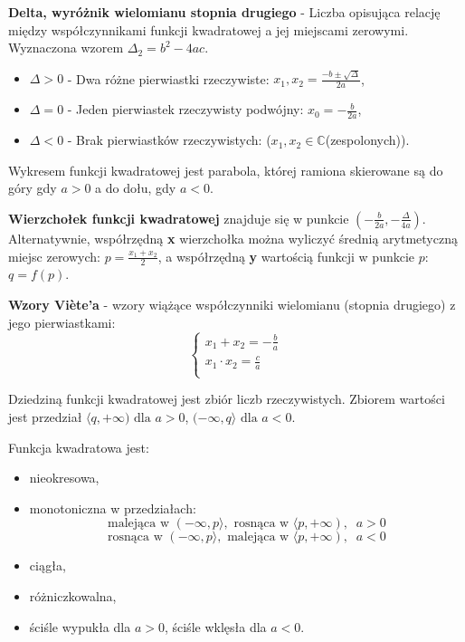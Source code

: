 \documentclass[14pt,a4paper]{extarticle}
\begin{document}
\noindent\textbf{Delta, wyróżnik wielomianu stopnia drugiego} - Liczba opisująca relację między współczynnikami funkcji 
kwadratowej a jej miejscami zerowymi. Wyznaczona wzorem $\Delta_{2} = b^{2} - 4ac$.
\begin{itemize}
   \item $\Delta > 0$ - Dwa różne pierwiastki rzeczywiste: $x_{1}, x_{2} = \frac{-b \pm\sqrt{\Delta}}{2a}$,
   \item $\Delta = 0$ - Jeden pierwiastek rzeczywisty podwójny: $x_{0} = -\frac{b}{2a}$,
   \item $\Delta < 0$ - Brak pierwiastków rzeczywistych: ($x_{1}, x_{2} \in \mathbb{C}$\;(zespolonych)).
\end{itemize}

\noindent Wykresem funkcji kwadratowej jest parabola, której ramiona skierowane są do góry gdy $a > 0$ a do dołu,
gdy $a < 0$.\hfill\break


\noindent\textbf{Wierzchołek funkcji kwadratowej} znajduje się w punkcie $\left(-\frac{b}{2a}, -\frac{\Delta}{4a}\right)$.
Alternatywnie, współrzędną \textbf{x} wierzchołka można wyliczyć średnią arytmetyczną miejsc zerowych: $p = \frac{x_{1} + x_{2}}{2}$, a 
współrzędną \textbf{y} wartością funkcji w punkcie $p$: $q = f(p)$.\hfill\break

\noindent\textbf{Wzory Viète'a} - wzory wiążące współczynniki wielomianu (stopnia drugiego) z jego pierwiastkami:\hfill\break
\begin{equation*}
   \left\{
      \begin{array}{ll}
         \!\!\!\!\!\!x_{1} + x_{2} = -\frac{\displaystyle b}{\displaystyle a}\\
         \!\!\!\!\!\!x_{1}\cdot x_{2} = \frac{\displaystyle c}{\displaystyle a}\\
      \end{array}
   \right.
   \end{equation*}

\noindent Dziedziną funkcji kwadratowej jest zbiór liczb rzeczywistych. Zbiorem wartości jest przedział
$\langle q, +\infty) \text{ dla } a > 0$, $(-\infty, q\rangle \text{ dla } a < 0$.\hfill\break

\noindent Funkcja kwadratowa jest:
\begin{itemize}
   \item nieokresowa,
   \item monotoniczna w przedziałach:
   $$\text{malejąca w }(-\infty, p\rangle, \text{ rosnąca w } \langle p, +\infty),\;\; a > 0$$
   $$\text{rosnąca w }(-\infty, p\rangle, \text{ malejąca w } \langle p, +\infty),\;\; a < 0$$
   \item ciągła,
   \item różniczkowalna,
   \item ściśle wypukła dla $a > 0$, ściśle wklęsła dla $a < 0$.

\end{itemize}
\end{document}
